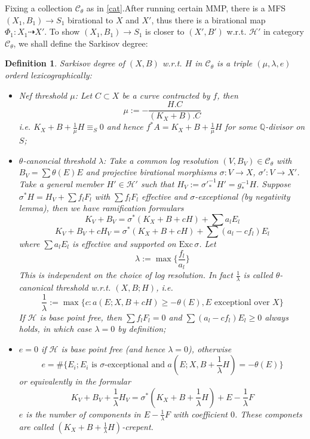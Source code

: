 \documentclass{article}
\newtheorem{defn}{Definition}[section]
\begin{document}
Fixing a collection $ \mathcal{C}_\theta $ as in \ref{cat}.After running certain MMP, there is  a MFS $ (X_1,B_1)\to S_1$ birational to $ X $ and $ X' $, thus there is a birational map $ \Phi_1:X_1\dashrightarrow X' $. To show $ (X_1,B_1)\to S_1 $ is closer to $ (X',B') $ w.r.t. $ \mathcal{H}' $ in category $ \mathcal{C}_\theta $, we shall define the Sarkisov degree:
\begin{defn}
  Sarkisov degree of $ (X,B) $ w.r.t. $ H $ in $ \mathcal{C}_\theta $ is a triple $ (\mu,\lambda,e) $ orderd lexicographically:
  \begin{itemize}
    \item Nef threshold $ \mu $: Let $ C\subset X  $ be a curve contracted by $ f $, then 
    $$ \mu:=-\frac{H.C}{(K_X+B).C} $$
    i.e. $ K_X+B+\frac{1}{\mu} H \equiv_S0$ and hence $ f^*A=K_X+B+\frac{1}{\mu} H $ for some $ \mathbb{Q} $-divisor on $ S $;
    \item $ \theta $-canoncial threshold $ \lambda $: Take a common log resolution  $ (V,B_V)\in \mathcal{C}_\theta $ with $ B_V=\sum \theta(E)E $ and projective birational morphisms $ \sigma:V\to X $, $ \sigma':V\to X' $. Take a general member $ H'\in \mathcal{H}' $ such that $ H_V:=\sigma'^{-1}_*H'=g^{-1}_*H $. Suppose $ \sigma^*H=H_V+\sum f_lF_l $ with $ \sum f_lF_l $ effective and $ \sigma $-exceptional (by negativity lemma), then we have ramification formulars
    $$ K_V+B_V=\sigma^*(K_X+B+cH)+\sum a_lE_l  $$
    $$ K_V+B_V+cH_V=\sigma^*(K_X+B+cH)+\sum(a_l-cf_l)E_l $$
    where $ \sum a_lE_l $ is effective and supported on $ \mathrm{Exc}\,\sigma $.   Let
    $$ \lambda:=\max\{ \frac{f_l}{a_l}\} $$
    This is independent on the choice of log resolution. In fact $ \frac{1}{\lambda} $ is called $ \theta $-canonical threshold w.r.t. $ (X,B;H) $, i.e.
    $$ \frac{1}{\lambda}:=\max\{c:a(E;X,B+cH)\geqslant-\theta(E) ,E\text{ exceptionl over }X \}$$ 
    If $ \mathcal{H} $ is base point free, then $ \sum f_lF_l=0 $ and $\sum(a_l-cf_l)E_l\geqslant 0  $ always holds, in which case $ \lambda=0 $ by definition;
    \item $ e=0 $ if $ \mathcal{H} $ is base point free (and hence $ \lambda=0 $), otherwise 
    $$ e=\#\{E_i; E_i \text{ is }\sigma\text{-exceptional and } a(E;X,B+\frac{1}{\lambda} H)=-\theta(E) \} $$
    or equivalently in the formular 
    $$ K_V+B_V+\frac{1}{\lambda} H_V=\sigma^*(K_X+B+\frac{1}{\lambda} H)+E-\frac{1}{\lambda} F $$
    $ e $ is the number of components in $ E-\frac{1}{\lambda} F $ with coefficient $ 0 $. These componets are called $ (K_X+B+\frac{1}{\lambda} H) $-crepent. 
  \end{itemize}
\end{defn}
\end{document}

